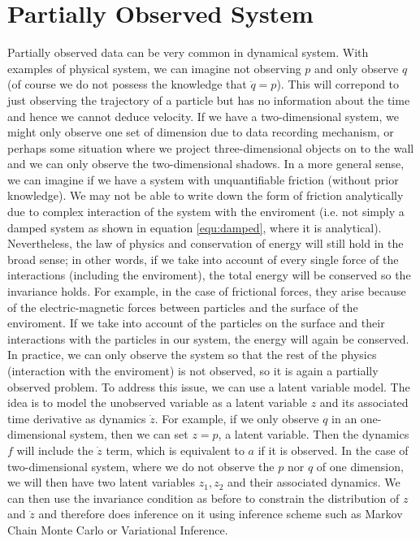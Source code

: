 \documentclass{statsmsc}
\begin{document}
\section{Partially Observed System}
Partially observed data can be very common in dynamical system.
With examples of physical system, we can imagine not observing $p$ and only observe $q$ (of course we do not possess the knowledge that $\dot{q}=p$).
This will correpond to just observing the trajectory of a particle but has no information about the time and hence we cannot deduce velocity.
If we have a two-dimensional system, we might only observe one set of dimension due to data recording mechanism, or perhaps some situation where we project three-dimensional objects on to the wall and we can only observe the two-dimensional shadows.
In a more general sense, we can imagine if we have a system with unquantifiable friction (without prior knowledge).
We may not be able to write down the form of friction analytically due to complex interaction of the system with the enviroment (i.e. not simply a damped system as shown in equation \ref{equ:damped}, where it is analytical).
Nevertheless, the law of physics and conservation of energy will still hold in the broad sense; 
in other words, if we take into account of every single force of the interactions (including the enviroment), the total energy will be conserved so the invariance holds. 
For example, in the case of frictional forces, they arise because of the electric-magnetic forces between particles and the surface of the enviroment.
If we take into account of the particles on the surface and their interactions with the particles in our system, the energy will again be conserved. 
In practice, we can only observe the system so that the rest of the physics (interaction with the enviroment) is not observed, so it is again a partially observed problem.
To address this issue, we can use a latent variable model. 
The idea is to model the unobserved variable as a latent variable $z$ and its associated time derivative as dynamics $\dot{z}$.
For example, if we only observe $q$ in an one-dimensional system, then we can set $z=p$, a latent variable. 
Then the dynamics $f$ will include the $\dot{z}$ term, which is equivalent to $a$ if it is observed. 
In the case of two-dimensional system, where we do not observe the $p$ nor $q$ of one dimension, we will then have two latent variables $z_1, z_2$ and their associated dynamics.
We can then use the invariance condition as before to constrain the distribution of $z$ and $\dot{z}$ and therefore does inference on it using inference scheme such as Markov Chain Monte Carlo or Variational Inference.
\end{document}
